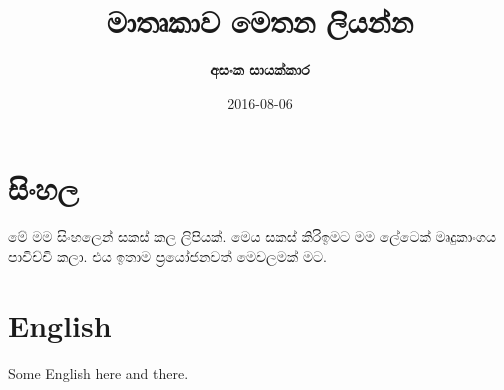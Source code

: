 \documentclass{article}
\title{\bf\serifbb මාතෘකාව මෙතන ලියන්න}
\author{\bf\serif අසංක සායක්කාර}
\date{2016-08-06}
\begin{document}
\maketitle

\section{\textbf{\serifsection සිංහල}}

මේ මම සිංහලෙන් සකස් කල ලිපියක්. මෙය සකස් කිරිඉමට මම ලේටෙක් මෘදුකාංගය පාවිච්චි කලා. එය ඉතාම ප්‍රයෝජනවත් මෙවලමක් මට.

\section{English}

Some English here and there.
\end{document}
